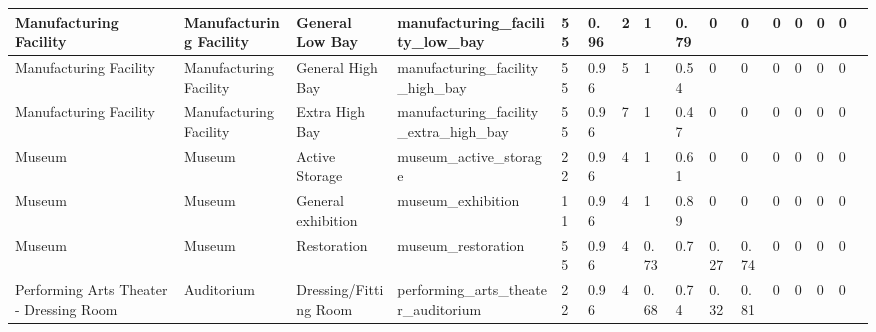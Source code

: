 \begin{center}
\begin{landscape}
\begin{longtable}{|p{0.75in}|p{0.75in}|p{0.75in}|p{0.75in}|p{0.3in}|p{0.3in}|p{0.3in}|p{0.3in}|p{0.3in}|p{0.3in}|p{0.3in}|p{0.3in}|p{0.3in}|p{0.3in}|p{0.3in}|p{0.6in}|}
      Manufacturing Facility                  & Manufacturing Facility      & General Low Bay                                 & manufacturing\_facility\_low\_bay                               & 55   & 0.96 & 2  & 1      & 0.79  & 0     & 0     & 0    & 0    & 0    & 0    &                                                                                       \\ \hline
      Manufacturing Facility                  & Manufacturing Facility      & General High Bay                                & manufacturing\_facility\_high\_bay                              & 55   & 0.96 & 5  & 1      & 0.54  & 0     & 0     & 0    & 0    & 0    & 0    &                                                                                       \\ \hline
      Manufacturing Facility                  & Manufacturing Facility      & Extra High Bay                                  & manufacturing\_facility\_extra\_high\_bay                       & 55   & 0.96 & 7  & 1      & 0.47  & 0     & 0     & 0    & 0    & 0    & 0    &                                                                                       \\ \hline
      Museum                                  & Museum                      & Active Storage                                  & museum\_active\_storage                                         & 22   & 0.96 & 4  & 1      & 0.61  & 0     & 0     & 0    & 0    & 0    & 0    &                                                                                       \\ \hline
      Museum                                  & Museum                      & General exhibition                              & museum\_exhibition                                              & 11   & 0.96 & 4  & 1      & 0.89  & 0     & 0     & 0    & 0    & 0    & 0    &                                                                                       \\ \hline
      Museum                                  & Museum                      & Restoration                                     & museum\_restoration                                             & 55   & 0.96 & 4  & 0.73   & 0.7   & 0.27  & 0.74  & 0    & 0    & 0    & 0    &                                                                                       \\ \hline
      Performing Arts Theater - Dressing Room & Auditorium                  & Dressing/Fitting Room                           & performing\_arts\_theater\_auditorium                           & 22   & 0.96 & 4  & 0.68   & 0.74  & 0.32  & 0.81  & 0    & 0    & 0    & 0    &                                                                                       \\ \hline

\end{longtable}
\end{landscape}
\end{center}
